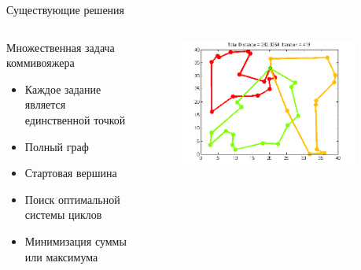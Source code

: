 \documentclass{beamer}
\begin{document}
\begin{frame}{Существующие решения}
\begin{columns}[onlytextwidth, t]
    \begin{column}{0.6\textwidth}
        Множественная задача коммивояжера
        \begin{itemize}
        \item Каждое задание является единственной точкой
        \item Полный граф
        \item Стартовая вершина
        \item Поиск оптимальной системы циклов
        \item Минимизация суммы или максимума
        \end{itemize}

    \end{column}
    \begin{column}{0.4\textwidth}

        \begin{figure}[here]
            \includegraphics[scale=0.4]{images/mtsp.png}
        \end{figure}
    \end{column}

​\end{columns}

\end{frame}
\end{document}
